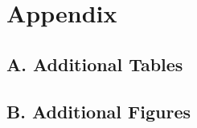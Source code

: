 \newpage
\renewcommand\thefigure{B.\arabic{figure}}    
\setcounter{figure}{0}

\renewcommand\thetable{A.\arabic{table}}    
\setcounter{table}{0}

\hypertarget{appendix}{%
\section*{Appendix}\label{appendix}}

\hypertarget{a.-additional-tables}{%
\subsection*{A. Additional Tables}\label{a.-additional-tables}}







\newpage

\hypertarget{b.-additional-figures}{%
\subsection*{B. Additional Figures}\label{b.-additional-figures}}

